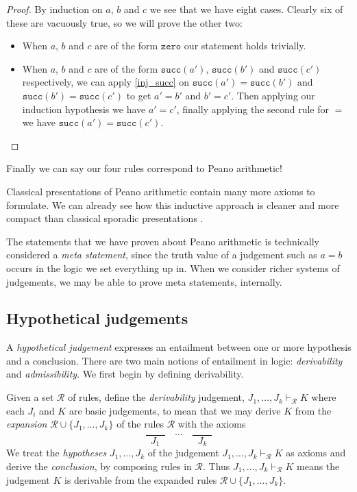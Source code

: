 \begin{proof}
    By induction on $a$, $b$ and $c$ we see that we have eight cases. Clearly six of these are vacuously true, so we will prove the other two:
    \begin{itemize}
        \item When $a$, $b$ and $c$ are of the form $\texttt{zero}$ our statement holds trivially.
        \item When $a$, $b$ and $c$ are of the form $\texttt{succ}(a')$, $\texttt{succ}(b')$ and $\texttt{succ}(c')$ respectively, we can apply \ref{inj_succ} on $\texttt{succ}(a') =\texttt{succ}(b')$ and $\texttt{succ}(b') = \texttt{succ}(c')$ to get $a' = b'$ and $b' = c'$. Then applying our induction hypothesis we have $a' = c'$, finally applying the second rule for $=$ we have $\texttt{succ}(a') =\texttt{succ}(c')$.
    \end{itemize}
\end{proof}

Finally we can say our four rules correspond to Peano arithmetic!

\begin{remark}
    Classical presentations of Peano arithmetic contain many more axioms to formulate. We can already see how this inductive approach is cleaner and more compact than classical sporadic presentations \cite{GlossarWiki:Goedel:1931}.
\end{remark}

\begin{remark}
    The statements that we have proven about Peano arithmetic is technically considered a \emph{meta statement}, since the truth value of a judgement such as $a = b$ occurs in the logic we set everything up in. When we consider richer systems of judgements, we may be able to prove meta statements, internally.
\end{remark}

\subsection{Hypothetical judgements}

A \emph{hypothetical judgement} expresses an entailment between one or more hypothesis and a conclusion. There are two main notions of entailment in logic: \emph{derivability} and \emph{admissibility}. We first begin by defining derivability.

\begin{defin}
    Given a set $\mathcal{R}$ of rules, define the \emph{derivability} judgement, $J_1,\dots,J_k \vdash_{\mathcal{R}} K$ where each $J_i$ and $K$ are basic judgements, to mean that we may derive $K$ from the \emph{expansion} $\mathcal{R} \cup \{ J_1, \dots, J_k \}$ of the rules $\mathcal{R}$ with the axioms
    $$
        \frac{\qquad}{J_1} \quad \cdots \quad \frac{\qquad}{J_k}
    $$
    We treat the \emph{hypotheses} $J_1, \dots, J_k$ of the judgement $J_1,\dots,J_k \vdash_{\mathcal{R}} K$ as axioms and derive the \emph{conclusion}, by composing rules in $\mathcal{R}$. Thus $J_1,\dots,J_k \vdash_{\mathcal{R}} K$ means the judgement $K$ is derivable from the expanded rules $\mathcal{R} \cup \{ J_1, \dots, J_k \}$.
\end{defin}

